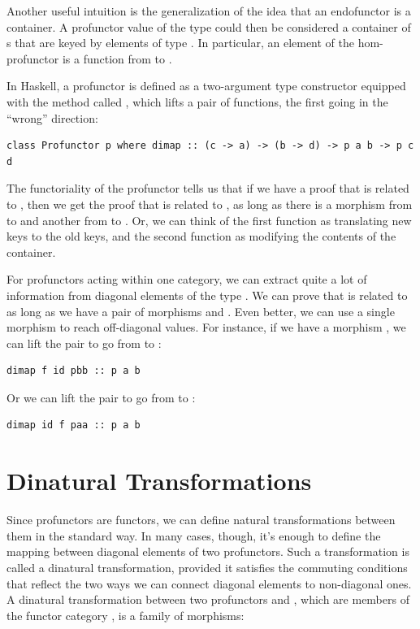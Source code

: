 Another useful intuition is the generalization of the idea that an
endofunctor is a container. A profunctor value of the type
 could then be considered a container of s
that are keyed by elements of type . In particular, an element
of the hom-profunctor is a function from  to .

In Haskell, a profunctor is defined as a two-argument type constructor
 equipped with the method called , which lifts a
pair of functions, the first going in the ``wrong'' direction:

\begin{verbatim}
class Profunctor p where dimap :: (c -> a) -> (b -> d) -> p a b -> p c d
\end{verbatim}

The functoriality of the profunctor tells us that if we have a proof
that  is related to , then we get the proof that
 is related to , as long as there is a morphism from
 to  and another from  to . Or,
we can think of the first function as translating new keys to the old
keys, and the second function as modifying the contents of the
container.

For profunctors acting within one category, we can extract quite a lot
of information from diagonal elements of the type . We
can prove that  is related to  as long as we have a
pair of morphisms  and
. Even better, we can use a single morphism to
reach off-diagonal values. For instance, if we have a morphism
, we can lift the pair
 to go from  to
:

\begin{verbatim}
dimap f id pbb :: p a b
\end{verbatim}

Or we can lift the pair  to go
from  to :

\begin{verbatim}
dimap id f paa :: p a b
\end{verbatim}

\section{Dinatural Transformations}\label{dinatural-transformations}

Since profunctors are functors, we can define natural transformations
between them in the standard way. In many cases, though, it's enough to
define the mapping between diagonal elements of two profunctors. Such a
transformation is called a dinatural transformation, provided it
satisfies the commuting conditions that reflect the two ways we can
connect diagonal elements to non-diagonal ones. A dinatural
transformation between two profunctors  and , which
are members of the functor category , is a
family of morphisms:

